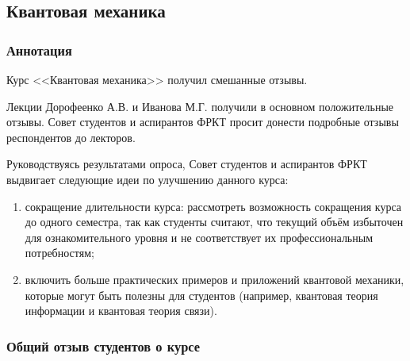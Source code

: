\subsection{Квантовая механика}
	
	\subsubsection{Аннотация}

		Курс <<Квантовая механика>> получил смешанные отзывы.

		Лекции Дорофеенко А.В. и Иванова М.Г. получили в основном положительные отзывы. Совет студентов и аспирантов ФРКТ просит донести подробные отзывы респондентов до лекторов.

		Руководствуясь результатами опроса, Совет студентов и аспирантов ФРКТ выдвигает следующие идеи по улучшению данного курса:
		\begin{enumerate}
			\item сокращение длительности курса: рассмотреть возможность сокращения курса до одного семестра, так как студенты считают, что текущий объём избыточен для ознакомительного уровня и не соответствует их профессиональным потребностям;
			\item включить больше практических примеров и приложений квантовой механики, которые могут быть полезны для студентов (например, квантовая теория информации и квантовая теория связи).
		\end{enumerate}

	\subsubsection{Общий отзыв студентов о курсе}

